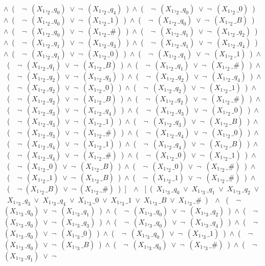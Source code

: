 ﻿\documentclass[a4paper,10pt]{article}
\begin{document}
$\wedge$\ (\ \ $\neg$\ $(X_1,_2\_q_0)$\ $\vee$\ $\neg$\ $(X_1,_2\_q_4)$\ )\ $\wedge$\ (\ \ $\neg$\ $(X_1,_2\_q_0)$\ $\vee$\ $\neg$\ $(X_1,_2\_0)$\ )\ $\wedge$\ (\ \ $\neg$\ $(X_1,_2\_q_0)$\ $\vee$\ $\neg$\ $(X_1,_2\_1)$\ )\ $\wedge$\ (\ \ $\neg$\ $(X_1,_2\_q_0)$\ $\vee$\ $\neg$\ $(X_1,_2\_B)$\ )\ $\wedge$\ (\ \ $\neg$\ $(X_1,_2\_q_0)$\ $\vee$\ $\neg$\ $(X_1,_2\_\#)$\ )\ $\wedge$\ (\ \ $\neg$\ $(X_1,_2\_q_1)$\ $\vee$\ $\neg$\ $(X_1,_2\_q_2)$\ )\ $\wedge$\ (\ \ $\neg$\ $(X_1,_2\_q_1)$\ $\vee$\ $\neg$\ $(X_1,_2\_q_3)$\ )\ $\wedge$\ (\ \ $\neg$\ $(X_1,_2\_q_1)$\ $\vee$\ $\neg$\ $(X_1,_2\_q_4)$\ )\ $\wedge$\ (\ \ $\neg$\ $(X_1,_2\_q_1)$\ $\vee$\ $\neg$\ $(X_1,_2\_0)$\ )\ $\wedge$\ (\ \ $\neg$\ $(X_1,_2\_q_1)$\ $\vee$\ $\neg$\ $(X_1,_2\_1)$\ )\ $\wedge$\ (\ \ $\neg$\ $(X_1,_2\_q_1)$\ $\vee$\ $\neg$\ $(X_1,_2\_B)$\ )\ $\wedge$\ (\ \ $\neg$\ $(X_1,_2\_q_1)$\ $\vee$\ $\neg$\ $(X_1,_2\_\#)$\ )\ $\wedge$\ (\ \ $\neg$\ $(X_1,_2\_q_2)$\ $\vee$\ $\neg$\ $(X_1,_2\_q_3)$\ )\ $\wedge$\ (\ \ $\neg$\ $(X_1,_2\_q_2)$\ $\vee$\ $\neg$\ $(X_1,_2\_q_4)$\ )\ $\wedge$\ (\ \ $\neg$\ $(X_1,_2\_q_2)$\ $\vee$\ $\neg$\ $(X_1,_2\_0)$\ )\ $\wedge$\ (\ \ $\neg$\ $(X_1,_2\_q_2)$\ $\vee$\ $\neg$\ $(X_1,_2\_1)$\ )\ $\wedge$\ (\ \ $\neg$\ $(X_1,_2\_q_2)$\ $\vee$\ $\neg$\ $(X_1,_2\_B)$\ )\ $\wedge$\ (\ \ $\neg$\ $(X_1,_2\_q_2)$\ $\vee$\ $\neg$\ $(X_1,_2\_\#)$\ )\ $\wedge$\ (\ \ $\neg$\ $(X_1,_2\_q_3)$\ $\vee$\ $\neg$\ $(X_1,_2\_q_4)$\ )\ $\wedge$\ (\ \ $\neg$\ $(X_1,_2\_q_3)$\ $\vee$\ $\neg$\ $(X_1,_2\_0)$\ )\ $\wedge$\ (\ \ $\neg$\ $(X_1,_2\_q_3)$\ $\vee$\ $\neg$\ $(X_1,_2\_1)$\ )\ $\wedge$\ (\ \ $\neg$\ $(X_1,_2\_q_3)$\ $\vee$\ $\neg$\ $(X_1,_2\_B)$\ )\ $\wedge$\ (\ \ $\neg$\ $(X_1,_2\_q_3)$\ $\vee$\ $\neg$\ $(X_1,_2\_\#)$\ )\ $\wedge$\ (\ \ $\neg$\ $(X_1,_2\_q_4)$\ $\vee$\ $\neg$\ $(X_1,_2\_0)$\ )\ $\wedge$\ (\ \ $\neg$\ $(X_1,_2\_q_4)$\ $\vee$\ $\neg$\ $(X_1,_2\_1)$\ )\ $\wedge$\ (\ \ $\neg$\ $(X_1,_2\_q_4)$\ $\vee$\ $\neg$\ $(X_1,_2\_B)$\ )\ $\wedge$\ (\ \ $\neg$\ $(X_1,_2\_q_4)$\ $\vee$\ $\neg$\ $(X_1,_2\_\#)$\ )\ $\wedge$\ (\ \ $\neg$\ $(X_1,_2\_0)$\ $\vee$\ $\neg$\ $(X_1,_2\_1)$\ )\ $\wedge$\ (\ \ $\neg$\ $(X_1,_2\_0)$\ $\vee$\ $\neg$\ $(X_1,_2\_B)$\ )\ $\wedge$\ (\ \ $\neg$\ $(X_1,_2\_0)$\ $\vee$\ $\neg$\ $(X_1,_2\_\#)$\ )\ $\wedge$\ (\ \ $\neg$\ $(X_1,_2\_1)$\ $\vee$\ $\neg$\ $(X_1,_2\_B)$\ )\ $\wedge$\ (\ \ $\neg$\ $(X_1,_2\_1)$\ $\vee$\ $\neg$\ $(X_1,_2\_\#)$\ )\ $\wedge$\ (\ \ $\neg$ $(X_1,_2\_B)$\ $\vee$\ $\neg$ $(X_1,_2\_\#)$\ )\ ]\ \ $\wedge$ \ [\ (\ $X_1,_3\_q_0$\ $\vee$\ $X_1,_3\_q_1$\ $\vee$\ $X_1,_3\_q_2$\ $\vee$\ $X_1,_3\_q_3$\ $\vee$\ $X_1,_3\_q_4$\ $\vee$\ $X_1,_3\_0$\ $\vee$\ $X_1,_3\_1$\ $\vee$\ $X_1,_3\_B$\ $\vee$\ $X_1,_3\_\#$\ )\ \ $\wedge$ \ (\ \ $\neg$\ $(X_1,_3\_q_0)$\ $\vee$\ $\neg$\ $(X_1,_3\_q_1)$\ )\ $\wedge$\ (\ \ $\neg$\ $(X_1,_3\_q_0)$\ $\vee$\ $\neg$\ $(X_1,_3\_q_2)$\ )\ $\wedge$\ (\ \ $\neg$\ $(X_1,_3\_q_0)$\ $\vee$\ $\neg$\ $(X_1,_3\_q_3)$\ )\ $\wedge$\ (\ \ $\neg$\ $(X_1,_3\_q_0)$\ $\vee$\ $\neg$\ $(X_1,_3\_q_4)$\ )\ $\wedge$\ (\ \ $\neg$\ $(X_1,_3\_q_0)$\ $\vee$\ $\neg$\ $(X_1,_3\_0)$\ )\ $\wedge$\ (\ \ $\neg$\ $(X_1,_3\_q_0)$\ $\vee$\ $\neg$\ $(X_1,_3\_1)$\ )\ $\wedge$\ (\ \ $\neg$\ $(X_1,_3\_q_0)$\ $\vee$\ $\neg$\ $(X_1,_3\_B)$\ )\ $\wedge$\ (\ \ $\neg$\ $(X_1,_3\_q_0)$\ $\vee$\ $\neg$\ $(X_1,_3\_\#)$\ )\ $\wedge$\ (\ \ $\neg$\ $(X_1,_3\_q_1)$\ $\vee$\ $\neg$\ 
\end{document}
